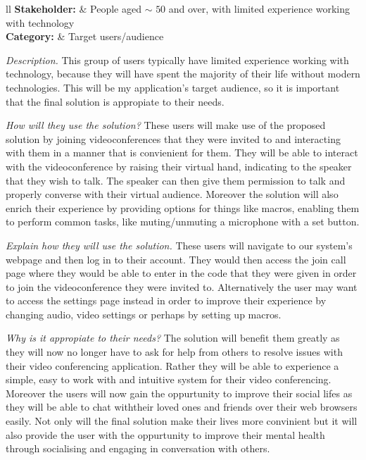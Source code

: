 \noindent
\begin{tblr}{ll}
  \textsf{\bfseries Stakeholder: } & {People aged $\sim$ 
  \hspace{-0.2cm} $50$ and over, with limited experience
  working with technology}\\
  \textsf{\bfseries Category: } & Target users/audience\\
\end{tblr}
\vspace{0.2cm}

\textit{Description.}  
This group of users typically have limited experience working 
with technology, because they will have spent the majority of
their life without modern technologies. This will be my 
application's target audience, so it is important that the 
final solution is appropiate to their needs. \vspace{0.2cm}

\textit{How will they use the solution?}
These users will make use of the proposed solution by joining
videoconferences that they were invited to and interacting with
them in a manner that is convienient for them. They will be 
able to interact with the videoconference by raising their 
virtual hand, indicating to the speaker that they wish to talk.
The speaker can then give them permission to talk and properly
converse with their virtual audience. Moreover the solution
will also enrich their experience by providing options for
things like macros, enabling them to perform common tasks,
like muting/unmuting a microphone with a set button.
\vspace{0.2cm}

\textit{Explain how they will use the solution.}
These users will navigate to our system's webpage and then
log in to their account. They would then access the join call 
page where they would be able to enter in the code that they 
were given in order to join the videoconference they were invited
to. Alternatively the user may want to access the settings page
instead in order to improve their experience by changing audio,
video settings or perhaps by setting up macros.
\vspace{0.2cm}

\textit{Why is it appropiate to their needs?}
The solution will benefit them greatly as they will now no 
longer have to ask for help from others to resolve issues with
their video conferencing application. Rather they will be able
to experience a simple, easy to work with and intuitive system
for their video conferencing. Moreover the users will now gain
the oppurtunity to improve their social lifes as they will be
able to chat withtheir loved ones and friends over their web 
browsers easily. Not only will the final solution make their 
lives more convinient but it will also provide the user with
the oppurtunity to improve their mental health through
socialising and engaging in conversation with others.
\cite{social}
\vspace{0.2cm}

